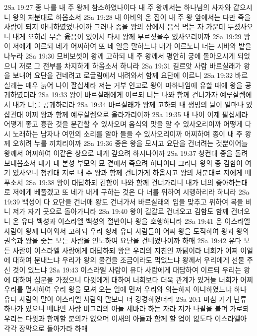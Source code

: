2Sa 19:27  종 나를 내 주 왕께 참소하였나이다 내 주 왕께서는 하나님의 사자와 같으시니 왕의 처분대로 하옵소서
2Sa 19:28  내 아비의 온 집이 내 주 왕 앞에서는 다만 죽을 사람이 되지 아니하였었나이까 그러나 종을 왕의 상에서 음식 먹는 자 가운데 두셨사오니 내게 오히려 무슨 옳음이 있어서 다시 왕께 부르짖을수 있사오리이까
2Sa 19:29  왕이 저에게 이르되 네가 어찌하여 또 네 일을 말하느냐 내가 이르노니 너는 시바와 밭을 나누라
2Sa 19:30  므비보셋이 왕께 고하되 내 주 왕께서 평안히 궁에 돌아오시게 되었으니 저로 그 전부를 차지하게 하옵소서 하니라
2Sa 19:31  길르앗 사람 바르실래가 왕을 보내어 요단을 건네려고 로글림에서 내려와서 함께 요단에 이르니
2Sa 19:32  바르실래는 매우 늙어 나이 팔십세라 저는 거부 인고로 왕이 마하나임에 유할 때에 왕을 공궤하였더라
2Sa 19:33  왕이 바르실래에게 이르되 너는 나와 함께 건너가자 예루살렘에서 내가 너를 공궤하리라
2Sa 19:34  바르실래가 왕께 고하되 내 생명의 날이 얼마나 있삽관대 어찌 왕과 함께 예루살렘으로 올라가리이까
2Sa 19:35  내 나이 이제 팔십세라 어떻게 좋고 흉한 것을 분간할 수 있사오며 음식의 맛을 알 수 있사오리이까 어떻게 다시 노래하는 남자나 여인의 소리를 알아 들을 수 있사오리이까 어찌하여 종이 내 주 왕께 오히려 누를 끼치리이까
2Sa 19:36  종은 왕을 모시고 요단을 건너려는 것뿐이어늘 왕께서 어찌하여 이같은 상으로 내게 갚으려 하시나이까
2Sa 19:37  청컨대 종을 돌려 보내옵소서 내가 내 본성 부모의 묘 곁에서 죽으려 하나이다 그러나 왕의 종 김함이 여기 있사오니 청컨대 저로 내 주 왕과 함께 건너가게 하옵시고 왕의 처분대로 저에게 베푸소서
2Sa 19:38  왕이 대답하되 김함이 나와 함께 건너가리니 내가 너의 좋아하는대로 저에게 베풀겠고 또 네가 내게 구하는 것은 다 너를 위하여 시행하리라 하니라
2Sa 19:39  백성이 다 요단을 건너매 왕도 건너가서 바르실래의 입을 맞추고 위하여 복을 비니 저가 자기 곳으로 돌아가니라
2Sa 19:40  왕이 길갈로 건너오고 김함도 함께 건너오니 온 유다 백성과 이스라엘 백성의 절반이나 왕을 호행하니라
2Sa 19:41  온 이스라엘 사람이 왕께 나아와서 고하되 우리 형제 유다 사람들이 어찌 왕을 도적하여 왕과 왕의 권속과 왕을 좇는 모든 사람을 인도하여 요단을 건네었나이까 하매
2Sa 19:42  유다 모든 사람이 이스라엘 사람에게 대답하되 왕은 우리의 지친인 까닭이라 너희가 어찌 이일에 대하여 분내느냐 우리가 왕의 물건을 조금이라도 먹었느냐 왕께서 우리에게 선물 주신 것이 있느냐
2Sa 19:43  이스라엘 사람이 유다 사람에게 대답하여 이르되 우리는 왕에 대하여 십분을 가졌으니 다윗에게 대하여 너희보다 더욱 관계가 있거늘 너희가 어찌 우리를 멸시하여 우리 왕을 모셔 오는 일에 먼저 우리와 의논하지 아니하였느냐 하나 유다 사람의 말이 이스라엘 사람의 말보다 더 강경하였더라
2Sa 20:1  마침 거기 난류 하나가 있으니 베냐민 사람 비그리의 아들 세바라 하는 자라 저가 나팔을 불며 가로되 우리는 다윗과 함께할 분의가 없으며 이새의 아들과 함께 할 업이 없도다 이스라엘아 각각 장막으로 돌아가라 하매
